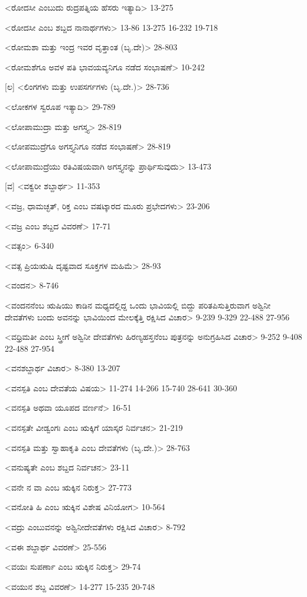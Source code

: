 <ರೋದಸೀ ಎಂಬುದು ರುದ್ರಪತ್ನಿಯ ಹೆಸರು ಇತ್ಯಾದಿ>
13-275

<ರೋದಸೀ ಎಂಬ ಶಬ್ದದ ನಾನಾರ್ಥಗಳು>
13-86 
13-275 
16-232
19-718

<ರೋಮಶಾ ಮತ್ತು ಇಂದ್ರ ಇವರ ವೃತ್ತಾಂತ (ಬೃ.ದೇ)>
28-803

<ರೋಮಶೆಗೂ ಅವಳ ಪತಿ ಭಾವಯವ್ಯನಿಗೂ ನಡೆದ ಸಂಭಾಷಣೆ>
10-242

[ಲ]
<ಲಿಂಗಗಳು ಮತ್ತು ಉಪಸರ್ಗಗಳು (ಬೃ.ದೇ.)>
28-736

<ಲೋಕಗಳ ಸ್ವರೂಪ ಇತ್ಯಾದಿ>
29-789

<ಲೋಪಾಮುದ್ರಾ ಮತ್ತು ಅಗಸ್ತ್ಯ>
28-819

<ಲೋಪಮುದ್ರೆಗೂ ಅಗಸ್ತ್ಯನಿಗೂ ನಡೆದ ಸಂಭಾಷಣೆ>
28-819

<ಲೋಪಾಮುದ್ರೆಯು ರತಿವಿಷಯವಾಗಿ ಅಗಸ್ತ್ಯನನ್ನು ಪ್ರಾರ್ಥಿಸುವುದು>
13-473

[ವ]
<ವಕ್ವರೀ ಶಬ್ದಾರ್ಥ>
11-353

<ವಜ್ರ, ಧಾಮಚ್ಛತ್‍, ರಿಕ್ತ ಎಂಬ ವಷಟ್ಕಾರದ ಮೂರು ಪ್ರಭೇದಗಳು>
23-206

<ವಜ್ರ ಎಂಬ ಶಬ್ದದ ವಿವರಣೆ>
17-71

<ವತ್ಸಂ>
6-340

<ವತ್ಸ ಪ್ರಿಯಋಷಿ ದೃಷ್ಟವಾದ ಸೂಕ್ತಗಳ ಮಹಿಮೆ>
28-93

<ವಂದನ>
8-746

<ವಂದನನೆಂಬ ಋಷಿಯು ಕಾಡಿನ ಮಧ್ಯದಲ್ಲಿದ್ದ ಒಂದು ಭಾವಿಯಲ್ಲಿ ಬಿದ್ದು ಪರಿತಪಿಸುತ್ತಿರುವಾಗ ಅಶ್ವಿನೀ ದೇವತೆಗಳು ಬಂದು ಅವನನ್ನು ಭಾವಿಯಿಂದ ಮೇಲಕ್ಕೆತ್ತಿ ರಕ್ಷಿಸಿದ ವಿಚಾರ>
9-239 
9-329
22-488 
27-956

<ವಧ್ರಿಮತೀ ಎಂಬ ಸ್ತ್ರೀಗೆ ಅಶ್ವಿನೀ ದೇವತೆಗಳು ಹಿರಣ್ಯಹಸ್ತನೆಂಬ ಪುತ್ರನನ್ನು ಅನುಗ್ರಹಿಸಿದ ವಿಚಾರ>
9-252 
9-408 
22-488 
27-954

<ವನಶಬ್ದಾರ್ಥ ವಿಚಾರ>
8-380 
13-207

<ವನಸ್ಪತಿ ಎಂಬ ದೇವತೆಯ ವಿಷಯ>
11-274 
14-266 
15-740 
28-641
30-360

<ವನಸ್ಪತಿ ಅಥವಾ ಯೂಪದ ವರ್ಣನೆ>
16-51

<ವನಸ್ಪತೇ ವೀಡ್ವಂಗಃ ಎಂಬ ಋಕ್ಕಿಗೆ ಯಾಸ್ಕರ ನಿರ್ವಚನ>
21-219

<ವನಸ್ಪತಿ ಮತ್ತು ಸ್ವಾಹಾಕೃತಿ ಎಂಬ ದೇವತೆಗಳು (ಬೃ.ದೇ.)>
28-763

<ವನುಷ್ಯತೇ ಎಂಬ ಶಬ್ದದ ನಿರ್ವಚನ>
23-11

<ವನೇ ನ ವಾ ಎಂಬ ಋಕ್ಕಿನ ನಿರುಕ್ತ>
27-773

<ವನೋತಿ ಹಿ ಎಂಬ ಋಕ್ಕಿನ ವಿಶೇಷ ವಿನಿಯೋಗ>
10-564

<ವದ್ರು ಎಂಬುವನನ್ನು ಅಶ್ವಿನೀದೇವತೆಗಳು ರಕ್ಷಿಸಿದ ವಿಚಾರ>
8-792

<ವಈ ಶಬ್ದಾರ್ಥ ವಿವರಣೆ>
25-556

<ವಯಃ ಸುಪರ್ಣಾ ಎಂಬ ಋಕ್ಕಿನ ನಿರುಕ್ತ>
29-74

<ವಯುನ ಶಬ್ದ ವಿವರಣೆ>
14-277 
15-235
20-748


